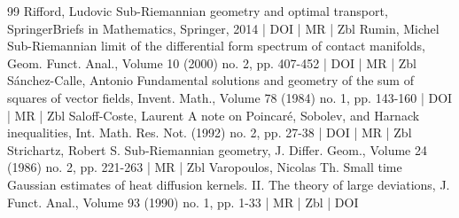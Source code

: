 \begin{thebibliography}{99}
Rifford, Ludovic Sub-Riemannian geometry and optimal transport, SpringerBriefs in Mathematics, Springer, 2014 | DOI | MR | Zbl
Rumin, Michel Sub-Riemannian limit of the differential form spectrum of contact manifolds, Geom. Funct. Anal., Volume 10 (2000) no. 2, pp. 407-452 | DOI | MR | Zbl
Sánchez-Calle, Antonio Fundamental solutions and geometry of the sum of squares of vector fields, Invent. Math., Volume 78 (1984) no. 1, pp. 143-160 | DOI | MR | Zbl
Saloff-Coste, Laurent A note on Poincaré, Sobolev, and Harnack inequalities, Int. Math. Res. Not. (1992) no. 2, pp. 27-38 | DOI | MR | Zbl
Strichartz, Robert S. Sub-Riemannian geometry, J. Differ. Geom., Volume 24 (1986) no. 2, pp. 221-263 | MR | Zbl
Varopoulos, Nicolas Th. Small time Gaussian estimates of heat diffusion kernels. II. The theory of large deviations, J. Funct. Anal., Volume 93 (1990) no. 1, pp. 1-33 | MR | Zbl | DOI
\end{thebibliography}
